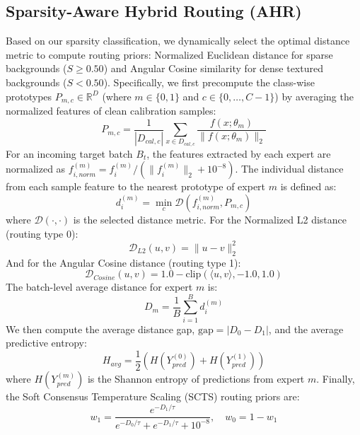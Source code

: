\documentclass{article}
\theoremstyle{plain}
\theoremstyle{definition}
\theoremstyle{remark}
\begin{document}
\subsection{Sparsity-Aware Hybrid Routing (AHR)}
Based on our sparsity classification, we dynamically select the optimal distance metric to compute routing priors: Normalized Euclidean distance for sparse backgrounds ($S \ge 0.50$) and Angular Cosine similarity for dense textured backgrounds ($S < 0.50$).
Specifically, we first precompute the class-wise prototypes $P_{m, c} \in \mathbb{R}^D$ (where $m \in \{0, 1\}$ and $c \in \{0, \ldots, C-1\}$) by averaging the normalized features of clean calibration samples:
\begin{equation}
  P_{m, c} = \frac{1}{|D_{cal, c}|} \sum_{x \in D_{cal, c}} \frac{f(x; \theta_m)}{\|f(x; \theta_m)\|_2}
\end{equation}
For an incoming target batch $B_t$, the features extracted by each expert are normalized as $f_{i, norm}^{(m)} = f_i^{(m)} / (\|f_i^{(m)}\|_2 + 10^{-8})$. The individual distance from each sample feature to the nearest prototype of expert $m$ is defined as:
\begin{equation}
  d_i^{(m)} = \min_{c} \mathcal{D}\left(f_{i, norm}^{(m)}, P_{m, c}\right)
\end{equation}
where $\mathcal{D}(\cdot, \cdot)$ is the selected distance metric. For the Normalized L2 distance (routing type 0):
\begin{equation}
  \mathcal{D}_{L2}(u, v) = \|u - v\|_2^2
\end{equation}
And for the Angular Cosine distance (routing type 1):
\begin{equation}
  \mathcal{D}_{Cosine}(u, v) = 1.0 - \text{clip}\left(\langle u, v \rangle, -1.0, 1.0\right)
\end{equation}
The batch-level average distance for expert $m$ is:
\begin{equation}
  D_m = \frac{1}{B} \sum_{i=1}^B d_i^{(m)}
\end{equation}
We then compute the average distance gap, $\text{gap} = |D_0 - D_1|$, and the average predictive entropy:
\begin{equation}
  H_{avg} = \frac{1}{2}\left(H\left(Y^{(0)}_{pred}\right) + H\left(Y^{(1)}_{pred}\right)\right)
\end{equation}
where $H(Y^{(m)}_{pred})$ is the Shannon entropy of predictions from expert $m$.
Finally, the Soft Consensus Temperature Scaling (SCTS) routing priors are:
\begin{equation}
  w_1 = \frac{e^{-D_1 / \tau}}{e^{-D_0 / \tau} + e^{-D_1 / \tau} + 10^{-8}}, \quad w_0 = 1 - w_1
\end{equation}
\end{document}
